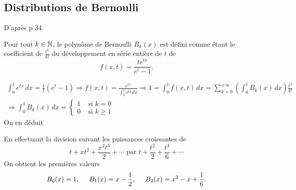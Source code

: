 \subsection{Distributions de Bernoulli}
D'après \cite{koblitz2012p} p 34.
\begin{defi}\label{Def:PolBernoulli}
 Pour tout $k\in \mathbb{N}$, le polynôme de Bernoulli $B_k(x)$ est défini comme étant le coefficient de $\frac{t^k}{k!}$ du développement en série entière de $t$ de
 \begin{displaymath}
  f(x,t) = \frac{t e^{tx}}{e^t - 1}.
 \end{displaymath}
\end{defi}

\begin{rem}
 \begin{multline*}
  \int_0^1 e^{tx}\, dx = \frac{1}{t} (e^t - 1) \Rightarrow f(x,t) = \frac{e^{tx}}{\int_0^1 e^{tx}\, dx}
  \Rightarrow 1 = \int_0^1 f(x,t)\,dx = \sum_{k=0}^{+\infty}\left(\int_0^1 B_k(x)\,dx\right)  \frac{t^k}{k!} \\
  \Rightarrow
    \int_0^1 B_k(x)\,dx =
    \left\lbrace
      \begin{aligned}
        1 &\text{ si } k = 0\\
        0 &\text{ si } k \geq 1
      \end{aligned}
    \right.
 \end{multline*}
On en déduit
\end{rem}
\noindent En effectuant la division suivant les puissances croissantes de
\begin{displaymath}
 t + xt^2 + \frac{x^2t^3}{2} + \cdots \text{ par } t + \frac{t^2}{2} + \frac{t^3}{6} + \cdots
\end{displaymath}
On obtient les premières valeurs
\begin{displaymath}
 B_0(x) = 1 ,\hspace{0.5cm} B_1(x) = x - \frac{1}{2} ,\hspace{0.5cm} B_2(x) = x^2 - x + \frac{1}{6}.
\end{displaymath}


